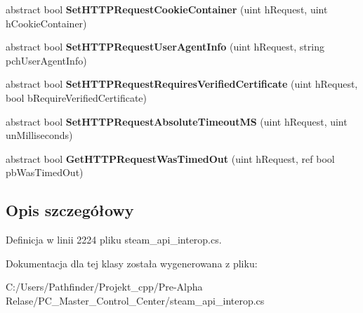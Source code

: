 \begin{DoxyCompactItemize}
abstract bool {\bfseries Set\+H\+T\+T\+P\+Request\+Cookie\+Container} (uint h\+Request, uint h\+Cookie\+Container)
\item 
\mbox{\label{class_valve_1_1_steamworks_1_1_i_steam_h_t_t_p_af4d1e0c5b5a9ebe1bfcf67687a0a8fb2}} 
abstract bool {\bfseries Set\+H\+T\+T\+P\+Request\+User\+Agent\+Info} (uint h\+Request, string pch\+User\+Agent\+Info)
\item 
\mbox{\label{class_valve_1_1_steamworks_1_1_i_steam_h_t_t_p_a86be9aa92c1c154b8ad8060a2ef18e74}} 
abstract bool {\bfseries Set\+H\+T\+T\+P\+Request\+Requires\+Verified\+Certificate} (uint h\+Request, bool b\+Require\+Verified\+Certificate)
\item 
\mbox{\label{class_valve_1_1_steamworks_1_1_i_steam_h_t_t_p_aa9a51b12b02d224c5bcbd09754f8801a}} 
abstract bool {\bfseries Set\+H\+T\+T\+P\+Request\+Absolute\+Timeout\+MS} (uint h\+Request, uint un\+Milliseconds)
\item 
\mbox{\label{class_valve_1_1_steamworks_1_1_i_steam_h_t_t_p_a38784cab3c8be214ee6e835fea17c3f5}} 
abstract bool {\bfseries Get\+H\+T\+T\+P\+Request\+Was\+Timed\+Out} (uint h\+Request, ref bool pb\+Was\+Timed\+Out)
\end{DoxyCompactItemize}


\subsection{Opis szczegółowy}


Definicja w linii 2224 pliku steam\+\_\+api\+\_\+interop.\+cs.



Dokumentacja dla tej klasy została wygenerowana z pliku\+:\begin{DoxyCompactItemize}
\item 
C\+:/\+Users/\+Pathfinder/\+Projekt\+\_\+cpp/\+Pre-\/\+Alpha Relase/\+P\+C\+\_\+\+Master\+\_\+\+Control\+\_\+\+Center/steam\+\_\+api\+\_\+interop.\+cs\end{DoxyCompactItemize}
